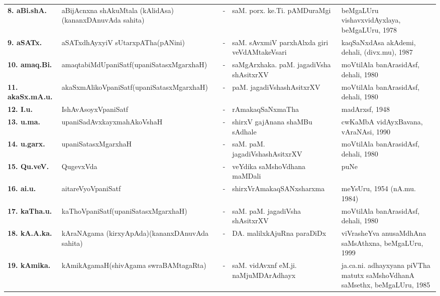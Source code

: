 {\begin{longtable}{lp{5cm}cp{5cm}<{\raggedright}p{3cm}<{\raggedright}@{}}
{\bf 8. aBi.shA.} & aBijAcnxna shAkuMtala (kAlidAsa)\newline (kananxDAnuvAda sahita) &-& saM. porx. ke.Ti. pAMDuraMgi &  beMgaLUru vishavxvidAyxlaya, beMgaLUru, 1978\\
{\bf 9. aSATx.} & aSATxdhAyxyiV sUtarxpATha\newline (pANini) &-& saM. sAvxmiV parxhAlxda giri veVdAMtakeVsari & kaqSaNxdAsa akAdemi, dehali, (divx.mu), 1987\\
{\bf 10. amaq.Bi.} & amaqtabiMdUpaniSatf\newline (upaniSatasxMgarxhaH) &-& saMgArxhaka. paM. jagadiVsha shAsitxrXV & moVtilAla banArasidAsf,  dehali, 1980\\
{\bf 11. akaSx.mA.u.} & akaSxmAlikoVpaniSatf\newline (upaniSatasxMgarxhaH) &-& paM. jagadiVshashAsitxrXV & moVtilAla banArasidAsf, dehali, 1980\\
{\bf 12. I.u.} & IshAvAsoyxVpaniSatf &-& rAmakaqSaNxmaTha & madArxsf, 1948\\
{\bf 13. u.ma.} & upaniSadAvxkayxmahAkoVshaH &-& shirxV gajAnana shaMBu sAdhale & cwKaMbA vidAyxBavana, vAraNAsi, 1990\\
{\bf 14. u.garx.} & upaniSatasxMgarxhaH &-& saM. paM. jagadiVshashAsitxrXV & moVtilAla banArasidAsf, dehali, 1980\\
{\bf 15. Qu.veV.} & QugevxVda &-& veYdika saMshoVdhana maMDali & puNe\\
{\bf 16. ai.u.} & aitareVyoVpaniSatf &-& shirxVrAmakaqSANxsharxma & meYsUru, 1954 (nA.mu. 1984)\\
{\bf 17. kaTha.u.} & kaThoVpaniSatf\newline (upaniSatasxMgarxhaH) &-& saM. paM. jagadiVsha shAsitxrXV & moVtilAla banArasidAsf, dehali, 1980\\
{\bf 18. kA.A.ka.} & kAraNAgama (kirxyApAda)\newline (kananxDAnuvAda sahita) &-& DA. malilxkAjuRna paraDiDx & viVrasheYva anusaMdhAna saMsAthxna, beMgaLUru, 1999\\
{\bf 19. kAmika.} & kAmikAgamaH\newline (shivAgama swraBAMtagaRta) &-& saM. vidAvxnf eM.ji. naMjuMDArAdhayx & ja.ca.ni. adhayxyana piVTha matutx saMshoVdhanA saMsethx, beMgaLUru, 1985\\

\end{longtable}}
